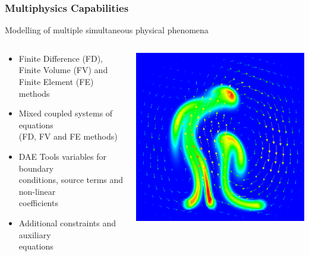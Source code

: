 \documentclass[compress,newPxFont,sthlmFooter]{beamer}
\begin{document}
\begin{frame}
\frametitle{Multiphysics Capabilities}
    Modelling of multiple simultaneous physical phenomena
    \begin{columns}[c]
      \begin{column}{0.6\paperwidth}
        {\small
        \begin{itemize}
            \item \alert{Finite Difference} (FD), \alert{Finite Volume} (FV) and \alert{Finite Element} (FE) methods
            \item Mixed coupled systems of equations \\ 
                  (FD, FV and FE methods)
            \item DAE Tools variables for boundary \\
                  conditions, source terms and non-linear \\
                  coefficients
            \item Additional constraints and auxiliary \\
                  equations
        \end{itemize}
        }
      \end{column}
      
      \begin{column}{0.27\paperwidth}
        \begin{center}
          \includegraphics[align=c, width=0.25\paperwidth]{buoyancy.png}
        \end{center}
      \end{column}
    \end{columns}
\end{frame}
\end{document}
